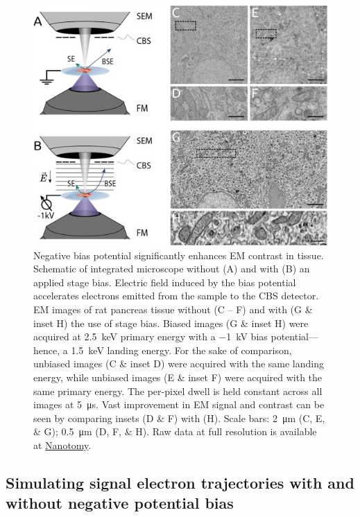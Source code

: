 \begin{figure}[!tb]
    \centering
    \includegraphics[width=\linewidth]{chapter-2/figures_JPEG_LQ/fig2-1_setup.jpg}
    \caption{Negative bias potential significantly enhances EM contrast in tissue. Schematic of integrated microscope without (A) and with (B) an applied stage bias. Electric field induced by the bias potential accelerates electrons emitted from the sample to the CBS detector. EM images of rat pancreas tissue without (C -- F) and with (G \& inset H) the use of stage bias. Biased images (G \& inset H) were acquired at \SI{2.5}{\kilo\electronvolt} primary energy with a \SI{-1}{\kilo\volt} bias potential---hence, a \SI{1.5}{\kilo\electronvolt} landing energy. For the sake of comparison, unbiased images (C \& inset D) were acquired with the same landing energy, while unbiased images (E \& inset F) were acquired with the same primary energy. The per-pixel dwell is held constant across all images at \SI{5}{\micro\second}. Vast improvement in EM signal and contrast can be seen by comparing insets (D \& F) with (H). Scale bars: \SI{2}{\micro\meter} (C, E, \& G); \SI{0.5}{\micro\meter} (D, F, \& H). Raw data at full resolution is available at \href{www.nanotomy.org}{Nanotomy}.}
    \label{fig:2.1_setup}
\end{figure}


\subsection{Simulating signal electron trajectories with and without negative potential bias}

